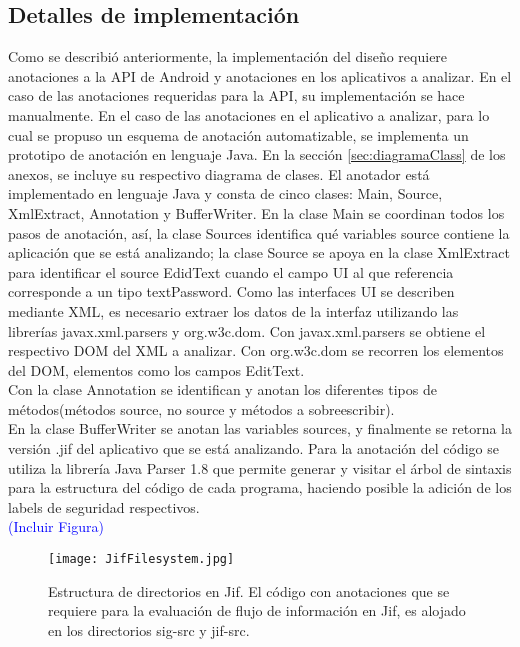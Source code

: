 \subsection{Detalles de implementación}
Como se describió anteriormente, la implementación del diseño requiere
anotaciones a la API de Android y anotaciones en los aplicativos a
analizar.\newline 
En el caso de las anotaciones requeridas para la API, su
implementación se hace manualmente.\newline
En el caso de las anotaciones en el aplicativo a analizar, para lo
cual se propuso un esquema de anotación automatizable, se implementa un
prototipo de anotación en lenguaje Java. En la sección \ref{sec:diagramaClass}
de los anexos, se incluye su respectivo diagrama de clases.\newline
El anotador está implementado en lenguaje Java y consta de cinco clases: Main,
Source, XmlExtract, Annotation y BufferWriter. 
En la clase Main se coordinan todos los pasos de anotación, así, la clase
Sources  identifica qué variables source contiene la aplicación que se está
analizando; la clase Source  se apoya en la clase XmlExtract  para
identificar el source EdidText cuando el campo UI al que referencia corresponde
a un tipo textPassword. Como las interfaces UI se describen mediante XML, es
necesario extraer los datos de la interfaz utilizando las librerías
javax.xml.parsers y org.w3c.dom. Con javax.xml.parsers se obtiene el respectivo
DOM del XML a analizar. Con org.w3c.dom se recorren los elementos del DOM,
elementos como los campos EditText.\\
Con la clase Annotation  se identifican y anotan los diferentes tipos de
métodos(métodos source, no source y métodos a sobreescribir).\\
En la clase BufferWriter  se anotan las variables sources, y finalmente se
retorna la versión .jif del aplicativo que se está analizando.\newline 
Para la anotación del código se utiliza la librería Java Parser 1.8  que permite
generar y visitar el árbol de sintaxis para la estructura del código de cada
programa, haciendo posible la adición de los labels de seguridad respectivos.\\
\textcolor{blue}{(Incluir Figura)}\newline
\label{subsec:anotador}
\begin{figure}[t!]
	\begin{center}
	\texttt{[image: JifFilesystem.jpg]}
	\end{center}
	\caption{Estructura de directorios en Jif.
	El código con anotaciones que se requiere para la evaluación de flujo de
	información en Jif, es alojado en los directorios sig-src y jif-src.}
	\label{fig:jifFilesystem} 
\end{figure}


